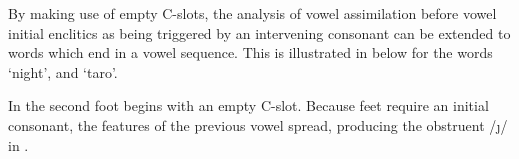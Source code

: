 \begin{exe}
\end{exe}

By making use of empty C-slots,
the analysis of vowel assimilation before vowel initial enclitics
as being triggered by an intervening consonant can be extended
to words which end in a vowel sequence.
This is illustrated in  below
for the words  {\ra}  `night',
and  {\ra}  `taro'.

In  the second foot begins with an empty C-slot.
Because feet require an initial consonant,
the features of the previous vowel spread,
producing the obstruent /\j/ in .

